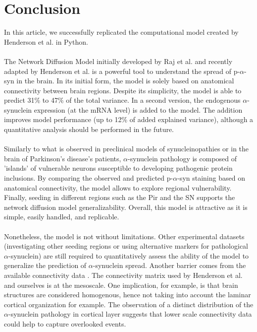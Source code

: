 \section{Conclusion}

In this article, we successfully replicated the computational model created by Henderson et al. \cite{Henderson_2019} in Python.\\
\\
The Network Diffusion Model initially developed by Raj et al. \cite{Raj_2012} and recently adapted by Henderson et al. \cite{Henderson_2019} is a powerful tool to understand the spread of p-$\alpha$-syn in the brain. In its initial form, the model is solely based on anatomical connectivity between brain regions. Despite its simplicity, the model is able to predict 31\% to 47\% of the total variance. In a second version, the endogenous $\alpha$-synuclein expression (at the mRNA level) is added to the model. The addition improves model performance (up to 12\% of added explained variance), although a quantitative analysis should be performed in the future. \\ 
\\
Similarly to what is observed in preclinical models of synucleinopathies or in the brain of Parkinson's disease's patients, $\alpha$-synuclein pathology is composed of 'islands' of vulnerable neurons susceptible to developing pathogenic protein inclusions. By comparing the observed and predicted p-$\alpha$-syn staining based on anatomical connectivity, the model allows to explore regional vulnerability. Finally, seeding in different regions such as the Pir and the SN supports the network diffusion model generalizability. Overall, this model is attractive as it is simple, easily handled, and replicable.\\
\\
Nonetheless, the model is not without limitations. Other experimental datasets (investigating other seeding regions or using alternative markers for pathological $\alpha$-synuclein) are still required to quantitatively assess the ability of the model to generalize the prediction of $\alpha$-synuclein spread. Another barrier comes from the available connectivity data \cite{Oh_2014}. The connectivity matrix used by Henderson et al. and ourselves is at the mesoscale. One implication, for example, is that brain structures are considered homogenous, hence not taking into account the laminar cortical organization for example. The observation of a distinct distribution of the $\alpha$-synuclein pathology in cortical layer suggests that lower scale connectivity data could help to capture overlooked events.\\
